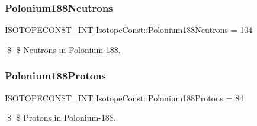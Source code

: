 \subsubsection{\texorpdfstring{Polonium188\+Neutrons}{Polonium188Neutrons}}
{\footnotesize\ttfamily \mbox{\hyperlink{group___isotope_const-_macros_ga5f18360b3e99483a35c32d789e62621c}{I\+S\+O\+T\+O\+P\+E\+C\+O\+N\+S\+T\+\_\+\+I\+NT}} Isotope\+Const\+::\+Polonium188\+Neutrons = 104}

\$ \$ Neutrons in Polonium-\/188. \mbox{\label{group___isotope_const-_polonium-_po188_gaa3344398d4092443fea44dd8a209275c}} 
\subsubsection{\texorpdfstring{Polonium188\+Protons}{Polonium188Protons}}
{\footnotesize\ttfamily \mbox{\hyperlink{group___isotope_const-_macros_ga5f18360b3e99483a35c32d789e62621c}{I\+S\+O\+T\+O\+P\+E\+C\+O\+N\+S\+T\+\_\+\+I\+NT}} Isotope\+Const\+::\+Polonium188\+Protons = 84}

\$ \$ Protons in Polonium-\/188. 